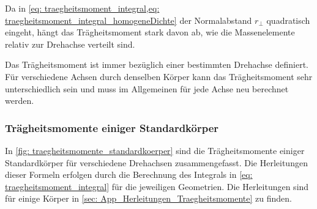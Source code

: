 Da in \cref{eq: traegheitsmoment_integral,eq: traegheitsmoment_integral_homogeneDichte} der Normalabstand $r_{\perp}$ quadratisch eingeht, hängt das Trägheitsmoment stark davon ab, wie die Massenelemente relativ zur Drehachse verteilt sind.

Das Trägheitsmoment ist immer bezüglich einer bestimmten Drehachse definiert. Für verschiedene Achsen durch denselben Körper kann das Trägheitsmoment sehr unterschiedlich sein und muss im Allgemeinen für jede Achse neu berechnet werden.

\subsubsection{Trägheitsmomente einiger Standardkörper}
In \cref{fig: traegheitsmomente_standardkoerper} sind die Trägheitsmomente einiger Standardkörper für verschiedene Drehachsen zusammengefasst. Die Herleitungen dieser Formeln erfolgen durch die Berechnung des Integrals in \cref{eq: traegheitsmoment_integral} für die jeweiligen Geometrien. Die Herleitungen sind für einige Körper in \cref{sec: App_Herleitungen_Traegheitsmomente} zu finden.
